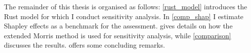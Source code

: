 

The remainder of this thesis is organised as follows: \cref{rust_model} introduces the Rust model for which I conduct sensitivity analysis. In \cref{comp_shap} I estimate Shapley effects as a benchmark for the assessment.  gives details on how the extended Morris method is used for sensitivity analysis, while \cref{comparison} discusses the results.  offers some concluding remarks.
